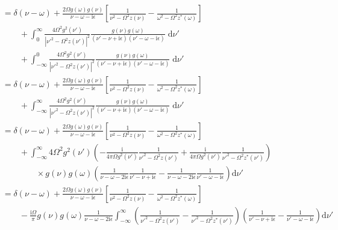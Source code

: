 \begin{equation}
\begin{split}
&= \delta(\nu - \omega) + \frac{2\Omega g(\omega)g(\nu)}{\nu - \omega - \mathrm{i}\epsilon}\left[\frac{1}{\nu^2 - \Omega^2z(\nu)} - \frac{1}{\omega^2 - \Omega^2z^*(\omega)}\right]\\
&\qquad + \int_0^\infty\frac{4\Omega^2 g^2(\nu')}{|\nu'^2 - \Omega^2z(\nu')|^2}\frac{g(\nu)g(\omega)}{(\nu' - \nu + \mathrm{i}\epsilon)(\nu' - \omega - \mathrm{i}\epsilon)}\;\mathrm{d}\nu'\\
&\qquad + \int_{-\infty}^0\frac{4\Omega^2g^2(\nu')}{|\nu'^2 - \Omega^2z(\nu')|^2}\frac{g(\nu)g(\omega)}{(\nu' - \nu + \mathrm{i}\epsilon)(\nu' - \omega - \mathrm{i}\epsilon)}\;\mathrm{d}\nu'\\
&= \delta(\nu - \omega) + \frac{2\Omega g(\omega)g(\nu)}{\nu - \omega - \mathrm{i}\epsilon}\left[\frac{1}{\nu^2 - \Omega^2z(\nu)} - \frac{1}{\omega^2 - \Omega^2z^*(\omega)}\right]\\
&\qquad + \int_{-\infty}^\infty\frac{4\Omega^2 g^2(\nu')}{|\nu'^2 - \Omega^2z(\nu')|^2}\frac{g(\nu)g(\omega)}{(\nu' - \nu + \mathrm{i}\epsilon)(\nu' - \omega - \mathrm{i}\epsilon)}\;\mathrm{d}\nu'\\
&= \delta(\nu - \omega) + \frac{2\Omega g(\omega)g(\nu)}{\nu - \omega - \mathrm{i}\epsilon}\left[\frac{1}{\nu^2 - \Omega^2z(\nu)} - \frac{1}{\omega^2 - \Omega^2z^*(\omega)}\right]\\
&\qquad + \int_{-\infty}^\infty4\Omega^2 g^2(\nu')\left(-\frac{\mathrm{i}}{4\pi\Omega g^2(\nu')}\frac{1}{\nu'^2 - \Omega^2z(\nu')} + \frac{\mathrm{i}}{4\pi\Omega g^2(\nu')}\frac{1}{\nu'^2 - \Omega^2z^*(\nu')}\right)\\
&\qquad\qquad\times g(\nu)g(\omega)\left(\frac{1}{\nu - \omega - 2\mathrm{i}\epsilon}\frac{1}{\nu' - \nu + \mathrm{i}\epsilon} - \frac{1}{\nu - \omega - 2\mathrm{i}\epsilon}\frac{1}{\nu' - \omega - \mathrm{i}\epsilon}\right)\mathrm{d}\nu'\\
&= \delta(\nu - \omega) + \frac{2\Omega g(\omega)g(\nu)}{\nu - \omega - \mathrm{i}\epsilon}\left[\frac{1}{\nu^2 - \Omega^2z(\nu)} - \frac{1}{\omega^2 - \Omega^2z^*(\omega)}\right]\\
&\qquad - \frac{\mathrm{i}\Omega}{\pi}g(\nu)g(\omega)\frac{1}{\nu - \omega - 2\mathrm{i}\epsilon}\int_{-\infty}^\infty\left(\frac{1}{\nu'^2 - \Omega^2z(\nu')} - \frac{1}{\nu'^2 - \Omega^2z^*(\nu')}\right)\left(\frac{1}{\nu' - \nu + \mathrm{i}\epsilon} - \frac{1}{\nu' - \omega - \mathrm{i}\epsilon}\right)\mathrm{d}\nu'\\

\end{split}
\end{equation}
